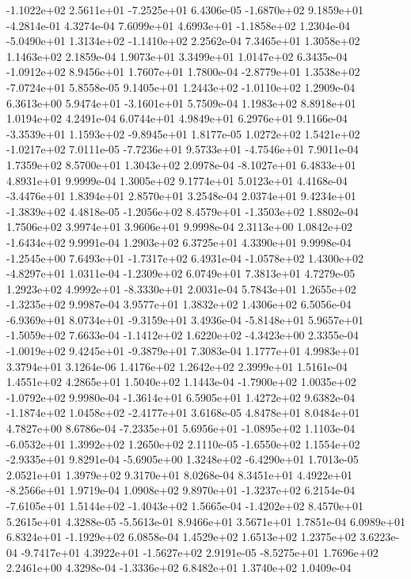 -1.1022e+02  2.5611e+01 -7.2525e+01  6.4306e-05
-1.6870e+02  9.1859e+01 -4.2814e-01  4.3274e-04
 7.6099e+01  4.6993e+01 -1.1858e+02  1.2304e-04
-5.0490e+01  1.3134e+02 -1.1410e+02  2.2562e-04
7.3465e+01 1.3058e+02 1.1463e+02  2.1859e-04
1.9073e+01 3.3499e+01 1.0147e+02  6.3435e-04
-1.0912e+02  8.9456e+01  1.7607e+01  1.7800e-04
-2.8779e+01  1.3538e+02 -7.0724e+01  5.8558e-05
 9.1405e+01  1.2443e+02 -1.0110e+02  1.2909e-04
 6.3613e+00  5.9474e+01 -3.1601e+01  5.7509e-04
1.1983e+02 8.8918e+01 1.0194e+02  4.2491e-04
6.0744e+01 4.9849e+01 6.2976e+01  9.1166e-04
-3.3539e+01  1.1593e+02 -9.8945e+01  1.8177e-05
 1.0272e+02  1.5421e+02 -1.0217e+02  7.0111e-05
-7.7236e+01  9.5733e+01 -4.7546e+01  7.9011e-04
1.7359e+02 8.5700e+01 1.3043e+02  2.0978e-04
-8.1027e+01  6.4833e+01  4.8931e+01  9.9999e-04
1.3005e+02 9.1774e+01 5.0123e+01  4.4168e-04
-3.4476e+01  1.8394e+01  2.8570e+01  3.2548e-04
 2.0374e+01  9.4234e+01 -1.3839e+02  4.4818e-05
-1.2056e+02  8.4579e+01 -1.3503e+02  1.8802e-04
1.7506e+02 3.9974e+01 3.9606e+01  9.9998e-04
 2.3113e+00  1.0842e+02 -1.6434e+02  9.9991e-04
1.2903e+02 6.3725e+01 4.3390e+01  9.9998e-04
-1.2545e+00  7.6493e+01 -1.7317e+02  6.4931e-04
-1.0578e+02  1.4300e+02 -4.8297e+01  1.0311e-04
-1.2309e+02  6.0749e+01  7.3813e+01  4.7279e-05
 1.2923e+02  4.9992e+01 -8.3330e+01  2.0031e-04
 5.7843e+01  1.2655e+02 -1.3235e+02  9.9987e-04
3.9577e+01 1.3832e+02 1.4306e+02  6.5056e-04
-6.9369e+01  8.0734e+01 -9.3159e+01  3.4936e-04
-5.8148e+01  5.9657e+01 -1.5059e+02  7.6633e-04
-1.1412e+02  1.6220e+02 -4.3423e+00  2.3355e-04
-1.0019e+02  9.4245e+01 -9.3879e+01  7.3083e-04
1.1777e+01 4.9983e+01 3.3794e+01  3.1264e-06
1.4176e+02 1.2642e+02 2.3999e+01  1.5161e-04
1.4551e+02 4.2865e+01 1.5040e+02  1.1443e-04
-1.7900e+02  1.0035e+02 -1.0792e+02  9.9980e-04
-1.3614e+01  6.5905e+01  1.4272e+02  9.6382e-04
-1.1874e+02  1.0458e+02 -2.4177e+01  3.6168e-05
4.8478e+01 8.0484e+01 4.7827e+00  8.6786e-04
-7.2335e+01  5.6956e+01 -1.0895e+02  1.1103e-04
-6.0532e+01  1.3992e+02  1.2650e+02  2.1110e-05
-1.6550e+02  1.1554e+02 -2.9335e+01  9.8291e-04
-5.6905e+00  1.3248e+02 -6.4290e+01  1.7013e-05
2.0521e+01 1.3979e+02 9.3170e+01  8.0268e-04
 8.3451e+01  4.4922e+01 -8.2566e+01  1.9719e-04
 1.0908e+02  9.8970e+01 -1.3237e+02  6.2154e-04
-7.6105e+01  1.5144e+02 -1.4043e+02  1.5665e-04
-1.4202e+02  8.4570e+01  5.2615e+01  4.3288e-05
-5.5613e-01  8.9466e+01  3.5671e+01  1.7851e-04
 6.0989e+01  6.8324e+01 -1.1929e+02  6.0858e-04
1.4529e+02 1.6513e+02 1.2375e+02  3.6223e-04
-9.7417e+01  4.3922e+01 -1.5627e+02  2.9191e-05
-8.5275e+01  1.7696e+02  2.2461e+00  4.3298e-04
-1.3336e+02  6.8482e+01  1.3740e+02  1.0409e-04
